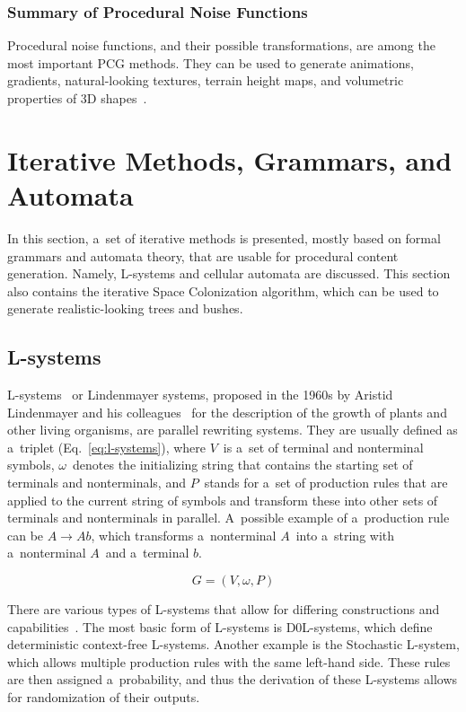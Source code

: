 \subsubsection*{Summary of Procedural Noise Functions}

Procedural noise functions, and their possible transformations, are among the most important PCG methods. They can be used to generate animations, gradients, natural-looking textures, terrain height maps, and volumetric properties of 3D shapes~\cite{lagae-proc-noise-survey, proc_gen_survey_mdpi}.


\section{Iterative Methods, Grammars, and Automata}
In this section, a~set of iterative methods is presented, mostly based on formal grammars and automata theory, that are usable for procedural content generation. Namely, L-systems and cellular automata are discussed. This section also contains the iterative Space Colonization algorithm, which can be used to generate realistic-looking trees and bushes.

\subsection{L-systems}
L-systems~\cite{l-systems-lindenmayer-1968, developmental-systems-l-systems} or Lindenmayer systems, proposed in the 1960s by Aristid Lindenmayer and his colleagues~\cite{l-systems-lindenmayer-1968, developmental-systems-l-systems} for the description of the growth of plants and other living organisms, are parallel rewriting systems. They are usually defined as a~triplet (Eq.~\ref{eq:l-systems}), where $V$~is a~set of terminal and nonterminal symbols, $\omega$~denotes the initializing string that contains the starting set of terminals and nonterminals, and $P$~stands for a~set of production rules that are applied to the current string of symbols and transform these into other sets of terminals and nonterminals in parallel. A~possible example of a~production rule can be $A \rightarrow Ab$, which transforms a~nonterminal $A$~into a~string with a~nonterminal $A$~and a~terminal $b$.

\begin{equation}\label{eq:l-systems}
    G = \left(V, \omega, P\right)
\end{equation}

There are various types of L-systems that allow for differing constructions and capabilities~\cite{developmental-systems-l-systems, l-systems-lindenmayer-1968, l-systems-application-1, l-systems-application-2}. The most basic form of L-systems is D0L-systems, which define deterministic context-free L-systems. Another example is the Stochastic L-system, which allows multiple production rules with the same left-hand side. These rules are then assigned a~probability, and thus the derivation of these L-systems allows for randomization of their outputs.

